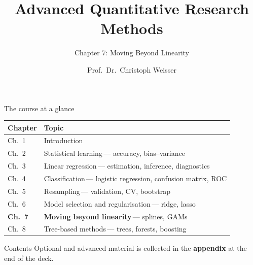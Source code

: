 \documentclass[aspectratio=169,11pt]{beamer}
\title{Advanced Quantitative Research Methods}
\subtitle{Chapter 7: Moving Beyond Linearity}
\author{Prof.\ Dr.\ Christoph Weisser}
\date{}\graphicspath{{images/}}
\begin{document}
\begin{frame}[plain]\titlepage\end{frame}

\begin{frame}{The course at a glance}
  \vspace{-1.5mm}
  \begin{center}
  \scriptsize
  \setlength{\tabcolsep}{5pt}
  \renewcommand{\arraystretch}{1.30}
  \begin{tabular}{@{\hspace{2pt}}l >{\raggedright\arraybackslash}p{}@{\hspace{2pt}}}
    \toprule
    \textbf{Chapter} & \textbf{Topic} \\
    \midrule
     {\color{accent}Ch.\ 1} & Introduction \\
    \rowcolor{black!3} {\color{accent}Ch.\ 2} & Statistical learning\,{\color{black!45}--- accuracy, bias--variance} \\
     {\color{accent}Ch.\ 3} & Linear regression\,{\color{black!45}--- estimation, inference, diagnostics} \\
    \rowcolor{black!3} {\color{accent}Ch.\ 4} & Classification\,{\color{black!45}--- logistic regression, confusion matrix, ROC} \\
     {\color{accent}Ch.\ 5} & Resampling\,{\color{black!45}--- validation, CV, bootstrap} \\
    \rowcolor{black!3} {\color{accent}Ch.\ 6} & Model selection and regularisation\,{\color{black!45}--- ridge, lasso} \\
    \rowcolor{accent!18} \textbf{Ch.\ 7} & \textbf{Moving beyond linearity}\,{\color{accent!75!black}--- splines, GAMs} \\
    \rowcolor{black!3} {\color{accent}Ch.\ 8} & Tree-based methods\,{\color{black!45}--- trees, forests, boosting} \\
    \bottomrule
  \end{tabular}
  \end{center}
\end{frame}


\begin{frame}{Contents}\small
  \tableofcontents[hideallsubsections]
  \vfill
  {\tiny Optional and advanced material is collected in the \textbf{appendix} at the end of the deck.}
\end{frame}
\end{document}
